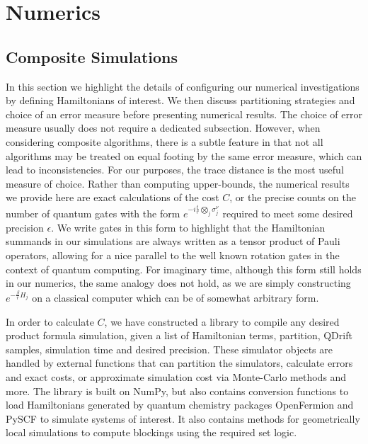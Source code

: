 
\newcommand{\fidel}{\mathscr{F}}
\newcommand{\tracedist}{\mathscr{T}}
\newcommand{\trotterchan}[2]{{S_{#1}{\parens{ #2 }}}}
\newcommand{\tschan}[2]{\mathcal{T}^{#1}{( #2 )}}
    
\newcommand{\achan}[1]{\mathcal{T}_{A}^{2k}{( #1 )}}
\newcommand{\bchan}[1]{\mathcal{Q}_{B}{( #1 )}}
 
\newcommand{\evolchan}[1]{\mathcal{U}{ ( #1 ) }}
\newcommand{\specnorm}[1]{\left| \left| #1 \right| \right|_\infty}
\newcommand{\liouv}{\mathcal{L}}
\newcommand{\prodform}{S_{2k}}
\newcommand{\indone}[1]{\norm{ #1 }_{1\rightarrow 1}}
\newcommand{\indonedef}[1]{\max_{\rho : \norm{\rho}=1} \norm{ #1 }_1}
    


\chapter{Numerics}


\section{Composite Simulations} \label{sec:numerical_sim}
In this section we highlight the details of configuring our numerical investigations by defining Hamiltonians of interest. We then discuss partitioning strategies and choice of an error measure before presenting numerical results. The choice of error measure usually does not require a dedicated subsection. However, when considering composite algorithms, there is a subtle feature in that not all algorithms may be treated on equal footing by the same error measure, which can lead to inconsistencies. For our purposes, the trace distance is the most useful measure of choice. Rather than computing upper-bounds, the numerical results we provide here are exact calculations of the cost $C$, or the precise counts on the number of quantum gates with the form $e^{-i\frac{t}{r} \bigotimes_j \sigma_j^\nu}$ required to meet some desired precision $\epsilon$. We write gates in this form to highlight that the Hamiltonian summands in our simulations are always written as a tensor product of Pauli operators, allowing for a nice parallel to the well known rotation gates in the context of quantum computing. For imaginary time, although this form still holds in our numerics, the same analogy does not hold, as we are simply constructing $e^{-\frac{\beta}{r} H_j}$ on a classical computer which can be of somewhat arbitrary form. 

In order to calculate $C$, we have constructed a library to compile any desired product formula simulation, given a list of Hamiltonian terms, partition, QDrift samples, simulation time and desired precision. These simulator objects are handled by external functions that can partition the simulators, calculate errors and exact costs, or approximate simulation cost via Monte-Carlo methods and more. The library is built on NumPy, but also contains conversion functions to load Hamiltonians generated by quantum chemistry packages OpenFermion \cite{mcclean2020openfermion} and PySCF \cite{sun2018pyscf} to simulate systems of interest. It also contains methods for geometrically local simulations to compute blockings using the required set logic.

